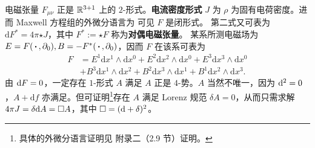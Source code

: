 \begin{example}
    电磁张量 $F_{\mu\nu}$ 正是 $\mathbb{R}^{3+1}$ 上的 $2$-形式。\textbf{电流密度形式} $J$ 为
$\rho$ 为固有电荷密度。进而 Maxwell 方程组的外微分语言为
可见 $F$ 是闭形式。
第二式又可表为 $\mathrm{d}F^*=4\pi{\star J}$，其中 $F^*:={\star}F$ 称为\textbf{对偶电磁张量}。
某系所测电磁场为 $E=F(\oo,\p_0),B=-F^*(\oo,\p_0)$，因而 $F$ 在该系可表为
\begin{align*}F&= E^{1} \mathrm{d} x^{1} \wedge \mathrm{d} x^{0}+E^{2} \mathrm{d} x^{2} \wedge \mathrm{d} x^{0}+E^{3} \mathrm{d} x^{3} \wedge \mathrm{d} x^{0} \\&+ B^{3} \mathrm{d} x^{1} \wedge \mathrm{d} x^{2}+B^{2} \mathrm{d} x^{3} \wedge \mathrm{d} x^{1}+B^{1} \mathrm{d} x^{2} \wedge \mathrm{d} x^{3}.\end{align*}
由 $\dd F=0$，一定存在 $1$-形式 $A$ 满足
$A$ 正是 $4$-势。$A$ 当然不唯一，因为 $\dd^{2}=0$，$A+\mathrm{d} f$ 亦满足。但可证明\footnote{具体的外微分语言证明见 \cite{Parrott} 附录二（2.9 节）证明。}存在 $A$ 满足 Lorenz 规范 $\delta A=0$，从而只需求解 $4\pi J=\delta\dd A=\square A$，其中 $\square=(\dd+\delta)^2$。
\end{example}

